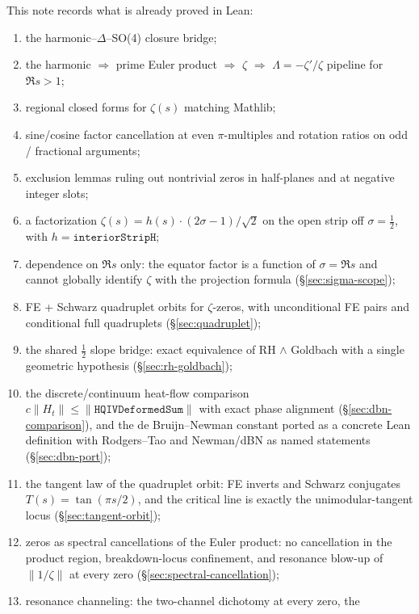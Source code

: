 \documentclass[11pt]{amsart}
\begin{document}
This note records what is already proved in Lean:
\begin{enumerate}[label=(\roman*),nosep]
\item the harmonic--$\Delta$--SO(4) closure bridge;
\item the harmonic $\Rightarrow$ prime Euler product $\Rightarrow$ $\zeta$
      $\Rightarrow$ $\Lambda=-\zeta'/\zeta$ pipeline for $\Re s>1$;
\item regional closed forms for $\zeta(s)$ matching Mathlib;
\item sine/cosine factor cancellation at even $\pi$-multiples and rotation ratios
      on odd / fractional arguments;
\item exclusion lemmas ruling out nontrivial zeros in half-planes and at
      negative integer slots;
\item a factorization $\zeta(s)=h(s)\cdot(2\sigma-1)/\sqrt2$ on the open strip
      off $\sigma=\tfrac12$, with $h=\texttt{interiorStripH}$;
\item dependence on $\Re s$ only: the equator factor is a function of
      $\sigma=\Re s$ and cannot globally identify $\zeta$ with the projection
      formula (\S\ref{sec:sigma-scope});
\item FE + Schwarz quadruplet orbits for $\zeta$-zeros, with unconditional FE
      pairs and conditional full quadruplets (\S\ref{sec:quadruplet});
\item the shared $\tfrac12$ slope bridge: exact equivalence of RH $\wedge$
      Goldbach with a single geometric hypothesis (\S\ref{sec:rh-goldbach});
\item the discrete/continuum heat-flow comparison
      $c\lVert H_t\rVert\le\lVert\texttt{HQIVDeformedSum}\rVert$ with exact
      phase alignment (\S\ref{sec:dbn-comparison}), and the de Bruijn--Newman
      constant ported as a concrete Lean definition with Rodgers--Tao and
      Newman/dBN as named statements (\S\ref{sec:dbn-port});
\item the tangent law of the quadruplet orbit: FE inverts and Schwarz
      conjugates $T(s)=\tan(\pi s/2)$, and the critical line is exactly the
      unimodular-tangent locus (\S\ref{sec:tangent-orbit});
\item zeros as spectral cancellations of the Euler product: no cancellation
      in the product region, breakdown-locus confinement, and resonance
      blow-up of $\lVert1/\zeta\rVert$ at every zero
      (\S\ref{sec:spectral-cancellation});
\item resonance channeling: the two-channel dichotomy at every zero, the

\end{enumerate}
\end{document}
